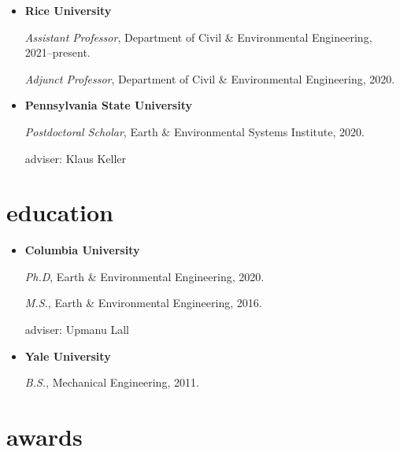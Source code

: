 \documentclass[11pt,article,oneside]{memoir}
\begin{document}
\mbox{}\vspace{-\dimexpr\baselineskip\relax}

\begin{itemize}[label={}]

  \item \textbf{Rice University}

        \textit{Assistant Professor}, Department of Civil \& Environmental Engineering, 2021--present.


        \textit{Adjunct Professor}, Department of Civil \& Environmental Engineering, 2020.



  \item \textbf{Pennsylvania State University}

        \textit{Postdoctoral Scholar}, Earth \& Environmental Systems Institute, 2020.

        adviser: Klaus Keller



\end{itemize}


\section{education}

\mbox{}\vspace{-\dimexpr\baselineskip\relax}

\begin{itemize}[label={}]

  \item \textbf{Columbia University}

        \textit{Ph.D}, Earth \& Environmental Engineering, 2020.

        \textit{M.S.}, Earth \& Environmental Engineering, 2016.


        adviser: Upmanu Lall


  \item \textbf{Yale University}

        \textit{B.S.}, Mechanical Engineering, 2011.



\end{itemize}


\section{awards}
\end{document}
